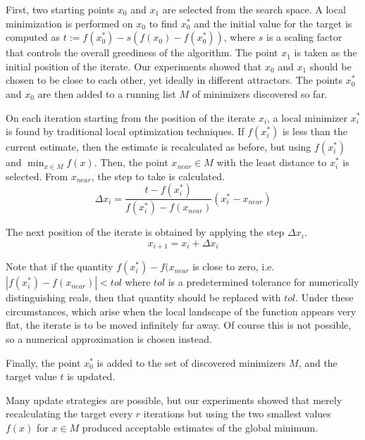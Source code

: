 \documentclass[12pt]{article}
\begin{document}
    First, two starting points $x_0$ and $x_1$ are selected from the search
    space.
    A local minimization is performed on $x_0$ to find $x_0^*$ and the
    initial value for the target is computed as
    $t := f(x_0^*) - s (f(x_0) - f(x_0^*))$,
    where $s$ is a scaling factor that controls the overall greediness of the
    algorithm.
    The point $x_1$ is taken as the initial position of the iterate. Our
    experiments showed that $x_0$ and $x_1$ should be chosen to be close to
    each other, yet ideally in different attractors.
    The points $x_0^*$ and $x_0$ are then added to a running list $M$ of
    minimizers discovered so far.

    On each iteration starting from the position of the iterate $x_i$, a local
    minimizer $x_i^*$ is found by traditional local optimization techniques.
    If $f(x_i^*)$ is less than the current estimate, then the estimate is
    recalculated as before, but using $f(x_i^*)$ and $\min_{x \in M} f(x)$.
    Then, the point $x_{near} \in M$ with the least distance to $x_i^*$ is
    selected.
    From $x_{near}$, the step to take is calculated.
    \begin{equation}
        \Delta x_i =
            \frac{t - f(x_i^*)}{f(x_i^*) - f(x_{near})} (x_i^* - x_{near})
        \label{eqn:dx}
    \end{equation}

    The next position of the iterate is obtained by applying the step
    $\Delta x_i$.
    $$
        x_{i+1} = x_i + \Delta x_i
    $$

    Note that if the quantity $f(x_i^*) - f(x_{near}$ is close to zero, i.e.
    $|f(x_i^*) - f(x_{near})| < tol$ where $tol$ is a predetermined tolerance
    for numerically distinguishing reals, then that quantity should be
    replaced with $tol$.
    Under these circumstances, which arise when the local landscape of the
    function appears very flat, the iterate is to be moved infinitely far away.
    Of course this is not possible, so a numerical approximation is chosen
    instead.

    Finally, the point $x_0^*$ is added to the set of discovered minimizers
    $M$, and the target value $t$ is updated.

    Many update strategies are possible, but our experiments showed that merely
    recalculating the target every $r$ iterations but using the two smallest
    values $f(x)$ for $x \in M$ produced acceptable estimates of the global
    minimum.
\end{document}
